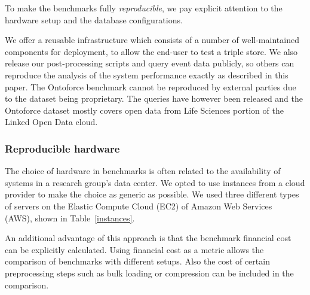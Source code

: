 
To make the benchmarks fully \emph{reproducible}, we pay explicit attention to the hardware setup and the database configurations. 

We offer a reusable infrastructure which consists of a number of well-maintained components for deployment, 
to allow the end-user to test a triple store. 
We also release our post-processing scripts and query event data publicly, so others can reproduce the analysis of the system performance exactly as described in this paper. 
The Ontoforce benchmark cannot be reproduced by external parties due to the dataset being proprietary. The queries have however been released and the Ontoforce dataset mostly covers open data from Life Sciences portion of the Linked Open Data cloud.

\subsubsection{Reproducible hardware}

The choice of hardware in benchmarks is often related to the availability of systems in a research group's data center.
We opted to use instances from a cloud provider to make the choice as generic as possible. 
We used three different types of servers on the Elastic Compute Cloud (EC2) of Amazon Web Services~\cite{ec2} (AWS), shown in Table~\ref{instances}. 

\begin{table}[ht!]
	\centering
	\caption{Instance types used in benchmarks and their purpose.}
	\label{instances}
\end{table}

An additional advantage of this approach is that the benchmark financial cost can be explicitly calculated. Using financial cost as a metric allows the comparison of benchmarks with different setups. Also the cost of certain preprocessing steps such as bulk loading or compression can be included in the comparison.

